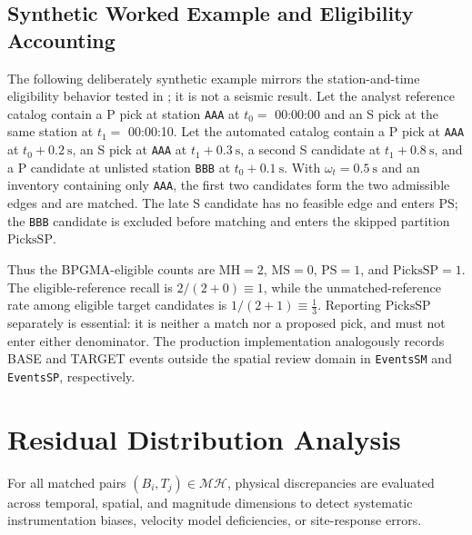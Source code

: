 \subsection{Synthetic Worked Example and Eligibility Accounting}
\label{subsec:bgma_worked_example}
The following deliberately synthetic example mirrors the
station-and-time eligibility behavior tested in
; it is not a seismic result. Let
the analyst reference catalog contain a P pick at station
\texttt{AAA} at $t_0=$ 00:00:00 and an S pick at the same station at
$t_1=$ 00:00:10. Let the automated catalog contain a P pick at
\texttt{AAA} at $t_0 + \qty{0.2}{\second}$, an S pick at \texttt{AAA}
at $t_1 + \qty{0.3}{\second}$, a second S candidate at
$t_1 + \qty{0.8}{\second}$, and a P candidate at unlisted station
\texttt{BBB} at $t_0 + \qty{0.1}{\second}$. With
$\omega_t = \qty{0.5}{\second}$ and an inventory containing only
\texttt{AAA}, the first two candidates form the two admissible edges
and are matched. The late S candidate has no feasible edge and
enters $\mathrm{PS}$; the \texttt{BBB} candidate is excluded before
matching and enters the skipped partition $\mathrm{PicksSP}$.

Thus the \acs{BPGMA}-eligible counts are $\mathrm{MH} = \num{2}$,
$\mathrm{MS} = \num{0}$,
$\mathrm{PS} = \num{1}$, and $\mathrm{PicksSP} = \num{1}$. The
eligible-reference
recall is $\num{2} / (\num{2} + \num{0}) \equiv \num{1}$, while the
unmatched-reference rate among
eligible target candidates is $\num{1} / (\num{2} + \num{1}) \equiv
\frac{\num{1}}{\num{3}}$. Reporting
$\mathrm{PicksSP}$ separately is essential: it is neither a match
nor a proposed pick, and must not enter either denominator. The
production implementation analogously records BASE and TARGET events
outside the spatial review domain in \texttt{EventsSM} and
\texttt{EventsSP}, respectively.

\section{Residual Distribution Analysis}
\label{sec:residuals}

For all matched pairs $(B_i, T_j) \in \mathcal{MH}$, physical
discrepancies are evaluated across temporal, spatial, and magnitude
dimensions to detect systematic instrumentation biases, velocity
model deficiencies, or site-response errors.

